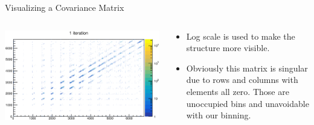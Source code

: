 \documentclass[aspectratio=169]{beamer}
\begin{document}
\begin{frame}{Visualizing a Covariance Matrix}
\begin{columns}
  \begin{column}{.6\textwidth}
    \includegraphics[width=\textwidth]{figures/cov_mat.eps}
  \end{column}
  \begin{column}{.4\textwidth}
    \begin{itemize}
      \item Log scale is used to make the structure more visible.
      \item Obviously this matrix is singular due to rows and columns with elements all zero. Those are unoccupied bins and unavoidable with our binning.
    \end{itemize}
  \end{column}
\end{columns}
\end{frame}
\end{document}
